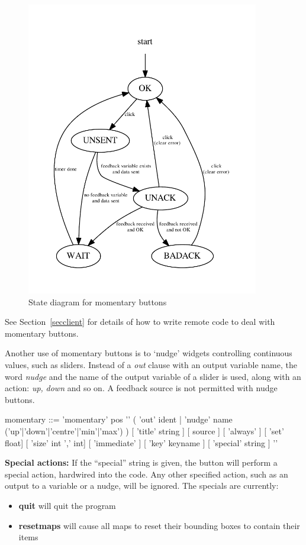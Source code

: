 \begin{figure}[ht]
\center
\includegraphics[width=4in]{stateMomentary.pdf}
\caption{State diagram for momentary buttons}
\label{momstates}
\end{figure}


See Section~\ref{secclient} for details of how to write remote
code to deal with momentary buttons.

Another use of momentary buttons is to `nudge' widgets controlling continuous
values, such as sliders. Instead of a \emph{out} clause with an output
variable name, the word \emph{nudge} and the name of the output variable of a
slider is used, along with an action: \emph{up,} \emph{down} and so on. A
feedback source is not permitted with nudge buttons.
\begin{v}
momentary  ::= 'momentary' pos '{'
                    ( 'out' ident |
                      'nudge' name ('up'|'down'|'centre'|'min'|'max') )
                    [ 'title' string ]
                    [ source ]
                    [ 'always' ]
                    [ 'set' float]
                    [ 'size' int ',' int]
                    [ 'immediate' ]
                    [ 'key' keyname ]
                    [ 'special' string ]
                '}'
\end{v}


\textbf{Special actions:} If the ``special'' string is given, the button will
perform a special action, hardwired into the code. Any other specified action,
such as an output to a variable or a nudge, will be ignored. The specials are
currently:
\begin{itemize}
\item \textbf{quit} will quit the program
\item \textbf{resetmaps} will cause all maps to reset their bounding boxes to contain their items
\end{itemize}


